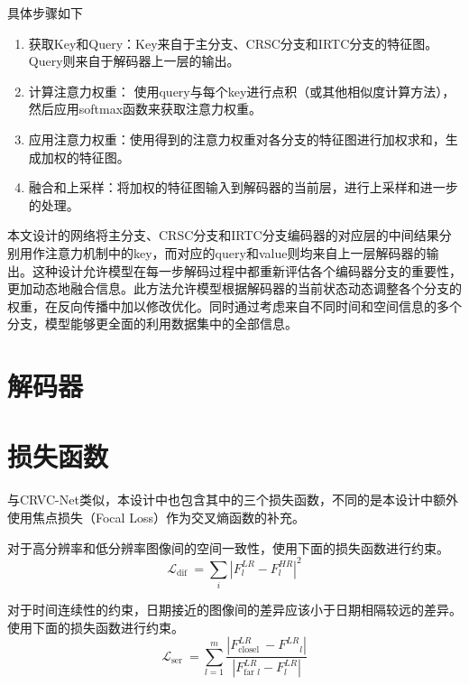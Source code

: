 具体步骤如下
\begin{enumerate}    
    \item 获取Key和Query：Key来自于主分支、CRSC分支和IRTC分支的特征图。 Query则来自于解码器上一层的输出。
    \item 计算注意力权重： 使用query与每个key进行点积（或其他相似度计算方法），然后应用softmax函数来获取注意力权重。
    \item 应用注意力权重：使用得到的注意力权重对各分支的特征图进行加权求和，生成加权的特征图。
    \item 融合和上采样：将加权的特征图输入到解码器的当前层，进行上采样和进一步的处理。
\end{enumerate}

本文设计的网络将主分支、CRSC分支和IRTC分支编码器的对应层的中间结果分别用作注意力机制中的key，而对应的query和value则均来自上一层解码器的输出。这种设计允许模型在每一步解码过程中都重新评估各个编码器分支的重要性，更加动态地融合信息。此方法允许模型根据解码器的当前状态动态调整各个分支的权重，在反向传播中加以修改优化。同时通过考虑来自不同时间和空间信息的多个分支，模型能够更全面的利用数据集中的全部信息。

\section{解码器}

\section{损失函数}
与CRVC-Net类似，本设计中也包含其中的三个损失函数，不同的是本设计中额外使用焦点损失（Focal Loss）作为交叉熵函数的补充。

对于高分辨率和低分辨率图像间的空间一致性，使用下面的损失函数进行约束。
\begin{equation}
    \mathcal{L}_{\text {dif }}=\sum_{i}\left|F_l^{L R}-F^{HR}_{l}\right|^2
\end{equation}

对于时间连续性的约束，日期接近的图像间的差异应该小于日期相隔较远的差异。使用下面的损失函数进行约束。
\begin{equation}
    \mathcal{L}_{\text {ser }}=\sum_{l=1}^{m} \frac{\left|F_{\text {closel }}^{L R}-F^{L R}{ }_{l}\right|}{\left|F_{\text {far } l}^{L R}-F^{L R}_ l\right|}
\end{equation}


